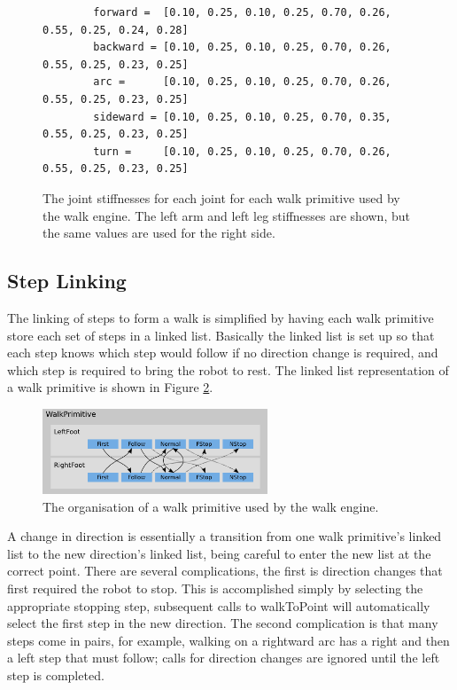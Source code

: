 \begin{figure}
	\begin{center}
		{\scriptsize\begin{verbatim}
		forward =  [0.10, 0.25, 0.10, 0.25, 0.70, 0.26, 0.55, 0.25, 0.24, 0.28]
		backward = [0.10, 0.25, 0.10, 0.25, 0.70, 0.26, 0.55, 0.25, 0.23, 0.25]
		arc =      [0.10, 0.25, 0.10, 0.25, 0.70, 0.26, 0.55, 0.25, 0.23, 0.25]
		sideward = [0.10, 0.25, 0.10, 0.25, 0.70, 0.35, 0.55, 0.25, 0.23, 0.25]
		turn =     [0.10, 0.25, 0.10, 0.25, 0.70, 0.26, 0.55, 0.25, 0.23, 0.25]
		\end{verbatim}}
		\caption{The joint stiffnesses for each joint for each walk primitive used by the walk engine. The left arm and left leg stiffnesses are shown, but the same values are used for the right side.}
		\label{fig:LocomotionWalkParameters2}
	\end{center}
\end{figure}

\subsection{Step Linking}

The linking of steps to form a walk is simplified by having each walk primitive store each set of steps in a linked list. Basically the linked list is set up so that each step knows which step would follow if no direction change is required, and which step is required to bring the robot to rest. The linked list representation of a walk primitive is shown in Figure \ref{LocomotionLinkedSteps}.

\begin{figure}[tbh]
	\begin{center}
		\includegraphics[width=0.6\textwidth]{locomotionfigs/linkedsteps.png}
		\caption{The organisation of a walk primitive used by the walk engine.}
		\label{LocomotionLinkedSteps}
	\end{center}
\end{figure}

A change in direction is essentially a transition from one walk primitive's linked list to the new direction's linked list, being careful to enter the new list at the correct point. There are several complications, the first is direction changes that first required the robot to stop. This is accomplished simply by selecting the appropriate stopping step, subsequent calls to walkToPoint will automatically select the first step in the new direction. The second complication is that many steps come in pairs, for example, walking on a rightward arc has a right and then a left step that must follow; calls for direction changes are ignored until the left step is completed. 

